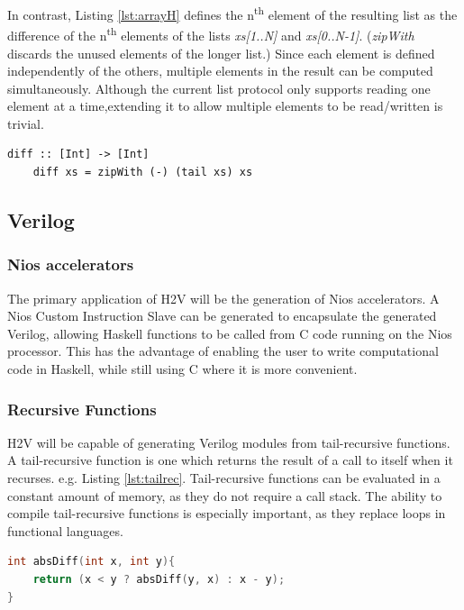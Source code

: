 \documentclass[english,onecolumn]{article}
\begin{document}
In contrast, Listing \ref{lst:arrayH} defines the n\textsuperscript{th} element of the resulting list as the difference of the
n\textsuperscript{th} elements of the lists \textit{xs[1..N]} and \textit{xs[0..N-1]}.
(\textit{zipWith} discards the unused elements of the longer list.)
Since each element is defined independently of the others, multiple elements in the result can be computed simultaneously.
Although the current list protocol only supports reading one element at a time,\footnotemark extending it to allow multiple elements to be read/written is trivial. %

\begin{lstlisting}[caption={Array Bottleneck Example (Haskell).}, label={lst:arrayH}]
    diff :: [Int] -> [Int]
    diff xs = zipWith (-) (tail xs) xs
\end{lstlisting}

\subsection{Verilog}
\subsubsection{Nios accelerators}
The primary application of H2V will be the generation of Nios accelerators. A Nios Custom Instruction Slave can be generated to encapsulate the generated Verilog, allowing Haskell functions to be called from C code running on the Nios processor.
This has the advantage of enabling the user to write computational code in Haskell, while still using C where it is more convenient.

\subsubsection{Recursive Functions}
H2V will be capable of generating Verilog modules from tail-recursive functions. A tail-recursive function is one which returns the  result of a call to itself when it recurses. e.g. Listing \ref{lst:tailrec}. Tail-recursive functions can be evaluated in a constant amount of memory, as they do not require a call stack. The ability to compile tail-recursive functions is especially important, as they replace loops in functional languages.

\begin{lstlisting}[language=C, caption={An example of a tail-recursive function in C.}, label={lst:tailrec}]
int absDiff(int x, int y){
    return (x < y ? absDiff(y, x) : x - y);
}
\end{lstlisting}
\end{document}
